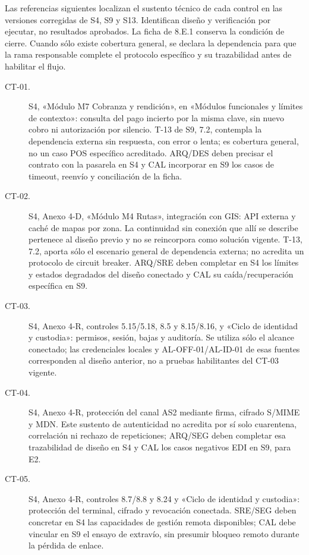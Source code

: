 Las referencias siguientes localizan el sustento técnico de cada control en las versiones corregidas de S4, S9 y S13. Identifican diseño y verificación por ejecutar, no resultados aprobados. La ficha de 8.E.1 conserva la condición de cierre. Cuando sólo existe cobertura general, se declara la dependencia para que la rama responsable complete el protocolo específico y su trazabilidad antes de habilitar el flujo.

\begin{description}
\item[CT-01.] S4, «Módulo M7 Cobranza y rendición», en «Módulos funcionales y límites de contexto»: consulta del pago incierto por la misma clave, sin nuevo cobro ni autorización por silencio. T-13 de S9, 7.2, contempla la dependencia externa sin respuesta, con error o lenta; es cobertura general, no un caso POS específico acreditado. ARQ/DES deben precisar el contrato con la pasarela en S4 y CAL incorporar en S9 los casos de timeout, reenvío y conciliación de la ficha.
\item[CT-02.] S4, Anexo 4-D, «Módulo M4 Rutas», integración con GIS: API externa y caché de mapas por zona. La continuidad sin conexión que allí se describe pertenece al diseño previo y no se reincorpora como solución vigente. T-13, 7.2, aporta sólo el escenario general de dependencia externa; no acredita un protocolo de circuit breaker. ARQ/SRE deben completar en S4 los límites y estados degradados del diseño conectado y CAL su caída/recuperación específica en S9.
\item[CT-03.] S4, Anexo 4-R, controles 5.15/5.18, 8.5 y 8.15/8.16, y «Ciclo de identidad y custodia»: permisos, sesión, bajas y auditoría. Se utiliza sólo el alcance conectado; las credenciales locales y AL-OFF-01/AL-ID-01 de esas fuentes corresponden al diseño anterior, no a pruebas habilitantes del CT-03 vigente.
\item[CT-04.] S4, Anexo 4-R, protección del canal AS2 mediante firma, cifrado S/MIME y MDN. Este sustento de autenticidad no acredita por sí solo cuarentena, correlación ni rechazo de repeticiones; ARQ/SEG deben completar esa trazabilidad de diseño en S4 y CAL los casos negativos EDI en S9, para E2.
\item[CT-05.] S4, Anexo 4-R, controles 8.7/8.8 y 8.24 y «Ciclo de identidad y custodia»: protección del terminal, cifrado y revocación conectada. SRE/SEG deben concretar en S4 las capacidades de gestión remota disponibles; CAL debe vincular en S9 el ensayo de extravío, sin presumir bloqueo remoto durante la pérdida de enlace.

\end{description}
